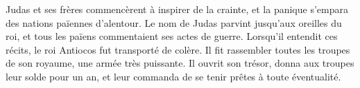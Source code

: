 Judas et ses frères commencèrent à inspirer de la crainte,
	et la panique s’empara des nations païennes d’alentour.
Le nom de Judas parvint jusqu’aux oreilles du roi,
	et tous les païens commentaient ses actes de guerre.
Lorsqu’il entendit ces récits, le roi Antiocos fut transporté de colère.
	Il fit rassembler toutes les troupes de son royaume, une armée très puissante.
Il ouvrit son trésor, donna aux troupes leur solde pour un an,
	et leur commanda de se tenir prêtes à toute éventualité.
